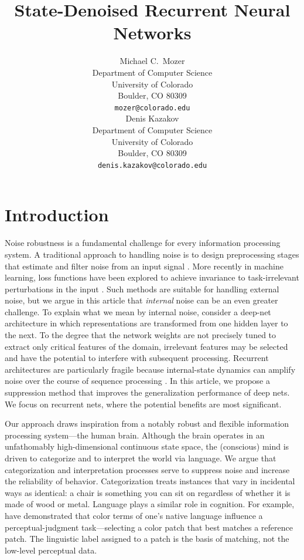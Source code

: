 \documentclass{article}
\title{State-Denoised Recurrent Neural Networks}
\author{
  Michael C.~Mozer\\
  Department of Computer Science\\
  University of Colorado\\
  Boulder, CO 80309\\
  \texttt{mozer@colorado.edu}\\
  \And
  Denis Kazakov\\
  Department of Computer Science\\
  University of Colorado\\
  Boulder, CO 80309\\
  \texttt{denis.kazakov@colorado.edu}\\
}
\begin{document}

\maketitle

\begin{abstract}
\end{abstract}

\section{Introduction}
Noise robustness is a fundamental challenge for every 
information processing system. A traditional approach to handling noise
is to design preprocessing stages that estimate and filter noise
from an input signal \citep{Boll1979}.
More recently in machine learning, loss functions have been explored to achieve
invariance to task-irrelevant perturbations in the input
\citep{Simard1992,Zheng2016}.  Such methods are suitable for handling external
noise, but we argue in this article that \emph{internal} noise can be an even
greater challenge. To explain what we mean by internal noise, consider a
deep-net architecture in which representations are transformed
from one hidden layer to the next. To the degree that the network weights are
not precisely tuned to extract only critical features of the domain, irrelevant
features may be selected and have the potential to interfere with subsequent
processing.  Recurrent architectures are particularly fragile because
internal-state dynamics can amplify noise over the course of sequence
processing \citep{MathisMozer1995}. In this article, we propose a suppression
method that improves the generalization performance of deep nets.
We focus on recurrent nets, where the potential benefits are most significant.

Our approach draws inspiration from a notably robust and flexible information
processing system---the human brain.  Although the brain operates in an
unfathomably high-dimensional continuous state space, the (conscious) mind is
driven to categorize and to interpret the world via language.  We argue that
categorization and interpretation processes serve to suppress noise and
increase the reliability of behavior. Categorization treats instances that
vary in incidental ways as identical: a chair is something you can sit on
regardless of whether it is made of wood or metal. Language plays a similar
role in cognition.  For example, \citet{Witthoftetal2003} have demonstrated
that color terms of one's native language influence a perceptual-judgment
task---selecting a color patch that best matches a reference patch.  The
linguistic label assigned to a patch is the basis of matching, not the 
low-level perceptual data.
\end{document}
